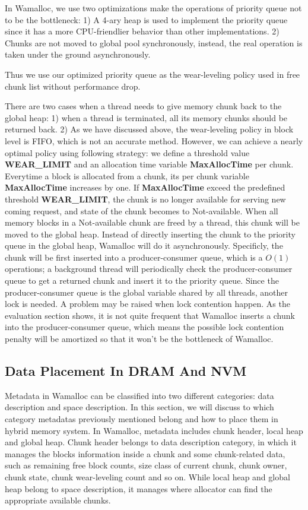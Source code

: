 \documentclass{vldb}
\begin{document}
In Wamalloc, we use two optimizations make the operations of priority queue not to be the bottleneck:
1) A 4-ary heap is used to implement the priority queue since it has a more CPU-friendlier behavior than other implementations.
2) Chunks are not moved to global pool synchronously, instead, the real operation is taken under the ground asynchronously.

Thus we use our optimized priority queue as the wear-leveling policy used in free chunk list without performance drop.

There are two cases when a thread needs to give memory chunk back to the global heap: 
1) when a thread is terminated, all its memory chunks should be returned back.
2) As we have discussed above, the wear-leveling policy in block level is FIFO, which is not an accurate method.
However, we can achieve a nearly optimal policy using following strategy: 
we define a threshold value \textbf{WEAR\_LIMIT} and an allocation time variable \textbf{MaxAllocTime} per chunk. 
Everytime a block is allocated from a chunk, its per chunk variable \textbf{MaxAllocTime} increases by one.
If \textbf{MaxAllocTime} exceed the predefined threshold \textbf{WEAR\_LIMIT}, 
the chunk is no longer available for serving new coming request, and state of the chunk becomes to Not-available.
When all memory blocks in a Not-available chunk are freed by a thread, this chunk will be moved to the global heap.
Instead of directly inserting the chunk to the priority queue in the global heap, Wamalloc will do it asynchronously.
Specificly, the chunk will be first inserted into a producer-consumer queue, which is a $O(1)$ operations;
a background thread will periodically check the producer-consumer queue to get a returned chunk and insert it to the priority queue.
Since the producer-consumer queue is the global variable shared by all threads, another lock is needed.
A problem may be raised when lock contention happen.
As the evaluation section shows, it is not quite frequent that Wamalloc inserts a chunk into the producer-consumer queue,
which means the possible lock contention penalty will be amortized so that it won't be the bottleneck of Wamalloc.

\subsection{Data Placement In DRAM And NVM}

Metadata in Wamalloc can be classified into two different categories: data description and space description.
In this section, we will discuss to which category metadatas previously mentioned belong and how to place them in hybrid memory system.
In Wamalloc, metadata includes chunk header, local heap and global heap.
Chunk header belongs to data description category, in which it manages the blocks information inside a chunk and some chunk-related data, such as remaining free block counts, size class of current chunk, chunk owner, chunk state, chunk wear-leveling count and so on.
While local heap and global heap belong to space description, it manages where allocator can find the appropriate available chunks.
\end{document}
